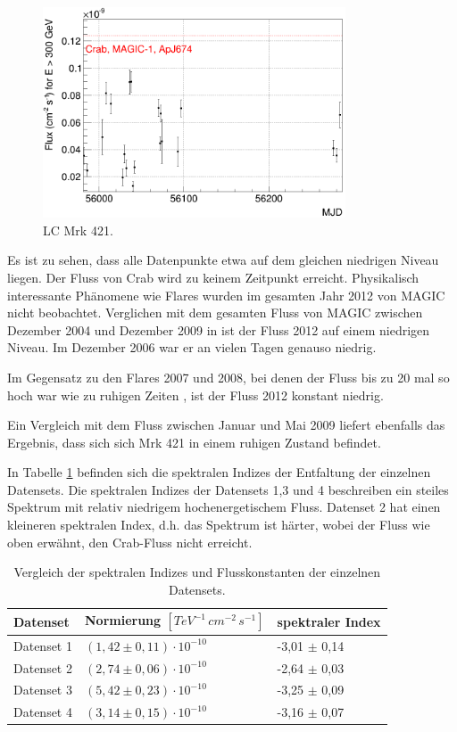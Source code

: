 \begin{figure}
    \centering
    \includegraphics[width=0.8\textwidth]{./Plots/04_MrkAnalyse/Alles_LC.png}
    \caption{LC Mrk 421.}
    \label{Alles_LC_Mrk421}
\end{figure}

Es ist zu sehen, dass alle Datenpunkte etwa auf dem gleichen niedrigen Niveau liegen.
Der Fluss von Crab wird zu keinem Zeitpunkt erreicht.
Physikalisch interessante Phänomene wie Flares wurden im gesamten Jahr 2012 von MAGIC nicht beobachtet.
Verglichen mit dem gesamten Fluss von MAGIC zwischen Dezember 2004 und Dezember 2009 in \cite{DissBackes} ist der Fluss 2012 auf einem niedrigen Niveau.
Im Dezember 2006 war er an vielen Tagen genauso niedrig.

Im Gegensatz zu den Flares 2007 und 2008, bei denen der Fluss bis zu 20 mal so hoch war wie zu ruhigen Zeiten \cite{DissBackes}, ist der Fluss 2012 konstant niedrig.

Ein Vergleich mit dem Fluss zwischen Januar und Mai 2009 \cite{DissDiego} liefert ebenfalls das Ergebnis, dass sich sich Mrk 421 in einem ruhigen Zustand befindet.

In Tabelle \ref{tab:SpektraleIndizes} befinden sich die spektralen Indizes der Entfaltung der einzelnen Datensets.
Die spektralen Indizes der Datensets 1,3 und 4 beschreiben ein steiles Spektrum mit relativ niedrigem hochenergetischem Fluss.
Datenset 2 hat einen kleineren spektralen Index, d.h. das Spektrum ist härter, wobei der Fluss wie oben erwähnt, den Crab-Fluss nicht erreicht.


\begin{table}[!h]
\centering
\caption{Vergleich der spektralen Indizes und Flusskonstanten der einzelnen Datensets.}
\label{tab:SpektraleIndizes}
\begin{tabular}{lll}
  \toprule
  Datenset & Normierung $\left[\si{TeV^{-1}\,cm^{-2}\,s^{-1}}\right]$ & spektraler Index\\
  \midrule
  \midrule
Datenset 1 & $(1,42\pm 0,11)\cdot 10^{-10}$ & -3,01 $\pm$ 0,14 \\
Datenset 2 & $(2,74\pm 0,06)\cdot 10^{-10}$ & -2,64 $\pm$ 0,03 \\
Datenset 3 & $(5,42\pm 0,23)\cdot 10^{-10}$ & -3,25 $\pm$ 0,09 \\
Datenset 4 & $(3,14\pm 0,15)\cdot 10^{-10}$ & -3,16 $\pm$ 0,07 \\
  \bottomrule
\end{tabular}
\end{table}

